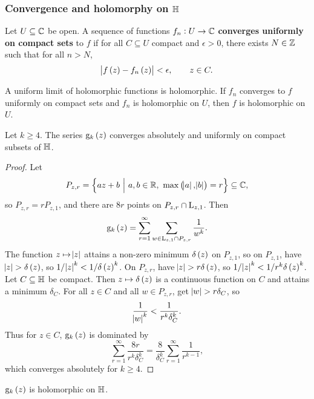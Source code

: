 \subsubsection{Convergence and holomorphy on \texorpdfstring{$ \mathbb{H} $}{H}}

\begin{definition}
Let $ U \subseteq \mathbb{C} $ be open. A sequence of functions $ f_n : U \to \mathbb{C} $ \textbf{converges uniformly on compact sets} to $ f $ if for all $ C \subseteq U $ compact and $ \epsilon > 0 $, there exists $ N \in \mathbb{Z} $ such that for all $ n > N $,
$$ \abs{f\br{z} - f_n\br{z}} < \epsilon, \qquad z \in C. $$
\end{definition}

\begin{theorem}
A uniform limit of holomorphic functions is holomorphic. If $ f_n $ converges to $ f $ uniformly on compact sets and $ f_n $ is holomorphic on $ U $, then $ f $ is holomorphic on $ U $.
\end{theorem}

\begin{theorem}
Let $ k \ge 4 $. The series $ \g_k\br{z} $ converges absolutely and uniformly on compact subsets of $ \mathbb{H} $.
\end{theorem}

\begin{proof}
Let
$$ P_{z, r} = \cbr{az + b \st a, b \in \RR, \ \max\br{\abs{a}, \abs{b}} = r} \subseteq \CC, $$
so $ P_{z, r} = rP_{z, 1} $, and there are $ 8r $ points on $ P_{z, r} \cap \mathrm{L}_{z, 1} $. Then
$$ \g_k\br{z} = \sum_{r = 1}^\infty \sum_{w \in \L_{z, 1} \cap P_{z, r}} \dfrac{1}{w^k}. $$
The function $ z \mapsto \abs{z} $ attains a non-zero minimum $ \delta\br{z} $ on $ P_{z, 1} $, so on $ P_{z, 1} $, have $ \abs{z} > \delta\br{z} $, so $ 1 / \abs{z}^k < 1 / \delta\br{z}^k $. On $ P_{z, r} $, have $ \abs{z} > r\delta\br{z} $, so $ 1 / \abs{z}^k < 1 / r^k\delta\br{z}^k $. Let $ C \subseteq \mathbb{H} $ be compact. Then $ z \mapsto \delta\br{z} $ is a continuous function on $ C $ and attains a minimum $ \delta_C $. For all $ z \in C $ and all $ w \in P_{z, r} $, get $ \abs{w} > r\delta_C $, so
$$ \dfrac{1}{\abs{w}^k} < \dfrac{1}{r^k\delta_C^k}. $$
Thus for $ z \in C $, $ \g_k\br{z} $ is dominated by
$$ \sum_{r = 1}^\infty \dfrac{8r}{r^k\delta_C^k} = \dfrac{8}{\delta_C^k}\sum_{r = 1}^\infty \dfrac{1}{r^{k - 1}}, $$
which converges absolutely for $ k \ge 4 $.
\end{proof}

\begin{corollary}
$ \g_k\br{z} $ is holomorphic on $ \mathbb{H} $.
\end{corollary}

